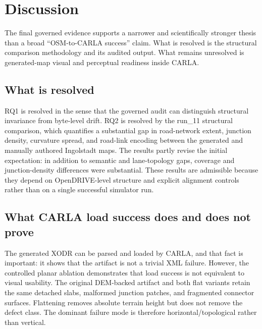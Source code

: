 \section{Discussion}
\label{sec:discussion}

The final governed evidence supports a narrower and scientifically stronger thesis than a broad ``OSM-to-CARLA success'' claim. What is resolved is the structural comparison methodology and its audited output. What remains unresolved is generated-map visual and perceptual readiness inside CARLA.

\subsection{What is resolved}
RQ1 is resolved in the sense that the governed audit can distinguish structural invariance from byte-level drift. RQ2 is resolved by the run\_11 structural comparison, which quantifies a substantial gap in road-network extent, junction density, curvature spread, and road-link encoding between the generated and manually authored Ingolstadt maps. The results partly revise the initial expectation: in addition to semantic and lane-topology gaps, coverage and junction-density differences were substantial. These results are admissible because they depend on OpenDRIVE-level structure and explicit alignment controls rather than on a single successful simulator run.

\subsection{What CARLA load success does and does not prove}
The generated XODR can be parsed and loaded by CARLA, and that fact is important: it shows that the artifact is not a trivial XML failure. However, the controlled planar ablation demonstrates that load success is not equivalent to visual usability. The original DEM-backed artifact and both flat variants retain the same detached slabs, malformed junction patches, and fragmented connector surfaces. Flattening removes absolute terrain height but does not remove the defect class. The dominant failure mode is therefore horizontal/topological rather than vertical.

